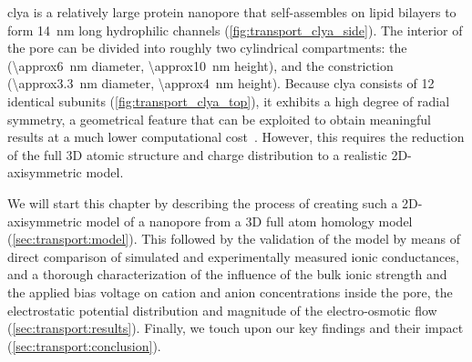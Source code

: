 \Gls{clya} is a relatively large protein nanopore that self-assembles on lipid bilayers to form \SI{14}{\nm}
long hydrophilic channels (\cref{fig:transport_clya_side}). The interior of the pore can be divided into
roughly two cylindrical compartments: the \cisi{} \lumen{} (\SI{\approx6}{\nm} diameter, \SI{\approx10}{\nm}
height), and the \transi{} constriction (\SI{\approx3.3}{\nm} diameter, \SI{\approx4}{\nm} height). Because
\gls{clya} consists of 12 identical subunits (\cref{fig:transport_clya_top}), it exhibits a high degree of
radial symmetry, a geometrical feature that can be exploited to obtain meaningful results at a much lower
computational cost~\cite{Cervera-2005,Lu-2012,Pederson-2015}. However, this requires the reduction of the full
3D atomic structure and charge distribution to a realistic 2D-axisymmetric model.

We will start this chapter by describing the process of creating such a 2D-axisymmetric model of a nanopore
from a 3D full atom homology model (\cref{sec:transport:model}). This followed by the validation of the model
by means of direct comparison of simulated and experimentally measured ionic conductances, and a thorough
characterization of the influence of the bulk ionic strength and the applied bias voltage on cation and anion
concentrations inside the pore, the electrostatic potential distribution and magnitude of the electro-osmotic
flow (\cref{sec:transport:results}). Finally, we touch upon our key findings and their impact
(\cref{sec:transport:conclusion}).


